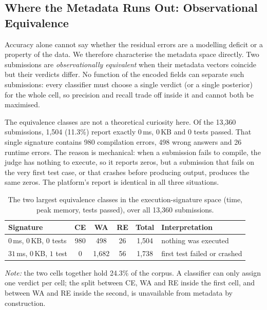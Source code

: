 \documentclass[acmsmall]{acmart}
\begin{document}
\subsection{Where the Metadata Runs Out: Observational Equivalence}

Accuracy alone cannot say whether the residual errors are a modelling deficit
or a property of the data. We therefore characterise the metadata space
directly. Two submissions are \emph{observationally equivalent} when their
metadata vectors coincide but their verdicts differ. No function of the encoded
fields can separate such submissions: every classifier must choose a single
verdict (or a single posterior) for the whole cell, so precision and recall
trade off inside it and cannot both be maximised.

The equivalence classes are not a theoretical curiosity here. Of the 13,360
submissions, 1{,}504 (11.3\%) report exactly $0$\,ms, $0$\,KB and $0$ tests
passed. That single signature contains 980 compilation errors, 498 wrong
answers and 26 runtime errors. The reason is mechanical: when a submission
fails to compile, the judge has nothing to execute, so it reports zeros, but a
submission that fails on the very first test case, or that crashes before
producing output, produces the same zeros. The platform's report is identical
in all three situations.

\begin{table}[htbp]
\centering
\caption{The two largest equivalence classes in the execution-signature space
 (time, peak memory, tests passed), over all 13,360 submissions.}
\label{tab:equivalence}
\begin{tabular}{@{}lccccl@{}}
\toprule
Signature & CE & WA & RE & Total & Interpretation \\
\midrule
$0$\,ms, $0$\,KB, $0$ tests & 980 & 498 & 26 & 1{,}504 & nothing was executed \\
$31$\,ms, $0$\,KB, $1$ test & 0 & 1{,}682 & 56 & 1{,}738 & first test failed or crashed \\
\bottomrule
\end{tabular}

\vspace{2mm}
{\small\textit{Note:} the two cells together hold 24.3\% of the corpus. A
classifier can only assign one verdict per cell; the split between CE, WA and
RE inside the first cell, and between WA and RE inside the second, is
unavailable from metadata by construction.}
\end{table}
\end{document}
